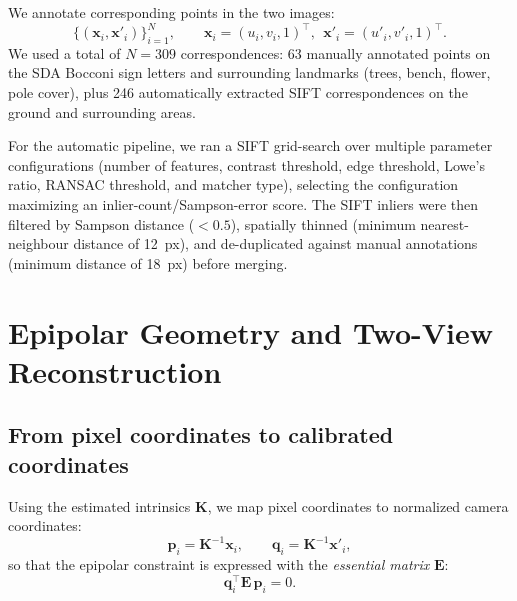 \documentclass{article}
\begin{document}
We annotate corresponding points in the two images:
\[
\{(\mathbf{x}_i,\mathbf{x}'_i)\}_{i=1}^N,\qquad
\mathbf{x}_i=(u_i,v_i,1)^\top,\ \ \mathbf{x}'_i=(u'_i,v'_i,1)^\top.
\]
We used a total of $N=309$ correspondences: 63 manually annotated points on the SDA Bocconi sign letters and surrounding landmarks (trees, bench, flower, pole cover), plus 246 automatically extracted SIFT correspondences on the ground and surrounding areas.

For the automatic pipeline, we ran a SIFT grid-search over multiple parameter configurations (number of features, contrast threshold, edge threshold, Lowe's ratio, RANSAC threshold, and matcher type), selecting the configuration maximizing an inlier-count/Sampson-error score.
The SIFT inliers were then filtered by Sampson distance ($<0.5$), spatially thinned (minimum nearest-neighbour distance of 12~px), and de-duplicated against manual annotations (minimum distance of 18~px) before merging.


\section{Epipolar Geometry and Two-View Reconstruction}

\subsection{From pixel coordinates to calibrated coordinates}
Using the estimated intrinsics $\mathbf{K}$, we map pixel coordinates to normalized camera coordinates:
\[
\mathbf{p}_i = \mathbf{K}^{-1}\mathbf{x}_i,\qquad
\mathbf{q}_i = \mathbf{K}^{-1}\mathbf{x}'_i,
\]
so that the epipolar constraint is expressed with the \emph{essential matrix} $\mathbf{E}$:
\begin{equation}
\mathbf{q}_i^\top \mathbf{E}\,\mathbf{p}_i = 0.
\label{eq:epi_constraint_E}
\end{equation}
\end{document}
